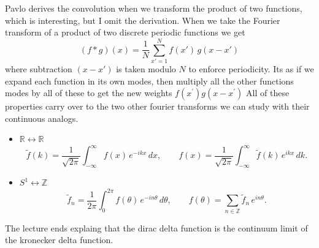 \documentclass[11pt,a4paper]{article}
\begin{document}
Pavlo derives the convolution when we transform the product of two functions, which is interesting, but I omit the derivation. When we take the Fourier transform of a product of two discrete periodic functions we get
\[
(f * g)(x)
= \frac{1}{N} \sum_{x'=1}^{N} f(x')\, g(x - x')
\]
where subtraction $(x - x')$ is taken modulo $N$ to enforce periodicity. Its as if we expand each function in its own modes, then multiply all the other functions modes by all of these to get the new weights $f(x^{\prime})g(x-x^{\prime})$
All of these properties carry over to the two other fourier transforms we can study with their continuous analogs.
\begin{itemize}
	\item $\mathbb{R} \leftrightarrow \mathbb{R}$
	\[
	\tilde{f}(k) = \frac{1}{\sqrt{2\pi}} \int_{-\infty}^{\infty} f(x)\, e^{-i k x}\, dx,
	\qquad
	f(x) = \frac{1}{\sqrt{2\pi}} \int_{-\infty}^{\infty} \tilde{f}(k)\, e^{i k x}\, dk.
	\]
	
	\item $S^{1} \leftrightarrow \mathbb{Z}$
	\[
	\tilde{f}_{n} = \frac{1}{2\pi} \int_{0}^{2\pi} f(\theta)\, e^{-i n \theta}\, d\theta,
	\qquad
	f(\theta) = \sum_{n \in \mathbb{Z}} \tilde{f}_{n}\, e^{i n \theta}.
	\]
\end{itemize}
The lecture ends explaing that the dirac delta function is the continuum limit of the kronecker delta function.
\end{document}
